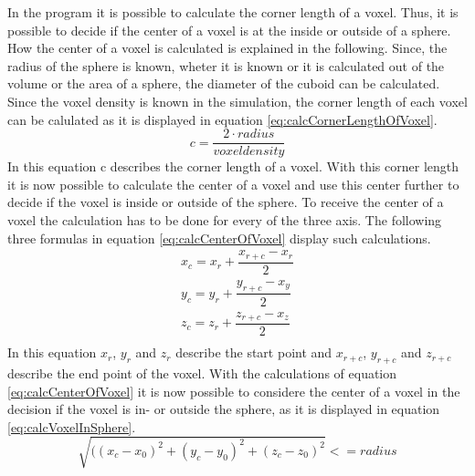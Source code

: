 In the program it is possible to calculate the corner length of a voxel. Thus, it is possible to decide if the center of a voxel is at the inside or outside of a sphere. How the center of a voxel is calculated is explained in the following. \newline
Since, the radius of the sphere is known, wheter it is known or it is calculated out of the volume or the area of a sphere,  the diameter of the cuboid can be calculated. Since the voxel density is known in the simulation, the corner length of each voxel can be calulated as it is displayed in equation \ref{eq:calcCornerLengthOfVoxel}.
\begin{equation}\label{eq:calcCornerLengthOfVoxel}
c = \dfrac{2 \cdot radius}{voxel density}
\end{equation}
In this equation c describes the corner length of a voxel. With this corner length it is now possible to calculate the center of a voxel and use this center further to decide if the voxel is inside or outside of the sphere. To receive the center of a voxel the calculation has to be done for every of the three axis. The following three formulas in equation \ref{eq:calcCenterOfVoxel} display such calculations. 
\begin{equation}\label{eq:calcCenterOfVoxel}
\begin{split}
x_{c} = x_{r} + \dfrac{x_{r+c} - x_{r}}{2} \\
y_{c} = y_{r} + \dfrac{y_{r+c} - x_{y}}{2} \\
z_{c} = z_{r} + \dfrac{z_{r+c} - x_{z}}{2} \\
\end{split}
\end{equation}
In this equation $x_{r}$, $y_{r}$ and $z_{r}$ describe the start point and $x_{r+c}$, $y_{r+c}$ and $z_{r+c}$ describe the end point of the voxel.
With the calculations of equation \ref{eq:calcCenterOfVoxel} it is now possible to considere the center of a voxel in the decision if the voxel is in- or outside the sphere, as it is displayed in equation \ref{eq:calcVoxelInSphere}.
\begin{equation}\label{eq:calcVoxelInSphere}
\sqrt{((x_{c} - x_{0})^{2} + (y_{c} - y_{0})^{2} + (z_{c} -z_{0})^{2}} <= radius
\end{equation}



